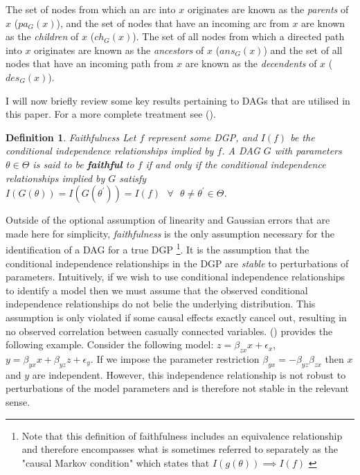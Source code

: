 \documentclass{article}
\newtheorem{definition}{Definition}
\begin{document}
The set of nodes from which an arc into $x$ originates are known as the \textit{parents} of $x$ ($pa_G(x)$), and the set of nodes that have an incoming arc from $x$ are known as the \textit{children} of $x$ ($ch_G(x)$). The set of all nodes from which a directed path into $x$ originates are known as the \textit{ancestors} of $x$ ($ans_G(x)$) and the set of all nodes that have an incoming path from $x$ are known as the \textit{decendents} of $x$ ($des_G(x)$). 

I will now briefly review some key results pertaining to DAGs that are utilised in this paper. For a more complete treatment see \citeauthor{pearl2009causality} (\citeyear{pearl2009causality}).

\theoremstyle{definition}
\begin{definition}{Faithfulness}
  Let $f$ represent some DGP, and $I(f)$ be the conditional independence relationships implied by $f$. A DAG $G$ with parameters $\theta \in \Theta$ is said to be \textbf{faithful} to $f$ if and only if the conditional independence relationships implied by $G$ satisfy $I(G(\theta)) = I(G(\theta^\prime)) = I(f) \text{  } \forall \text{  } \theta \not = \theta^\prime \in \Theta$.
  \parencite[p.48]{pearl2009causality}
  \label{faithfulness}
\end{definition}

Outside of the optional assumption of linearity and Gaussian errors that are made here for simplicity, \textit{faithfulness} is the only assumption necessary for the identification of a DAG for a true DGP \footnote{Note that this definition of faithfulness includes an equivalence relationship and therefore encompasses what is sometimes  referred to separately as the "causal Markov condition" which states that $I(g(\theta)) \implies I(f)$ \parencite{spirtes2016causal}}. It is the assumption that the conditional independence relationships in the DGP are \textit{stable} to perturbations of parameters. Intuitively, if we wish to use conditional independence relationships to identify a model then we must assume that the observed conditional independence relationships do not belie the underlying distribution. This assumption is only violated if some causal effects exactly cancel out, resulting in no observed correlation between casually connected variables. \citeauthor{pearl2009causality} (\citeyear{pearl2009causality}) provides the following example. Consider the following model: $z = \beta_{zx} x + \epsilon_x$, $ y = \beta_{yx} x + \beta_{yz} z + \epsilon_y$. If we impose the parameter restriction $\beta_{yx} = -\beta_{yz}\beta_{zx}$ then $x$ and $y$ are independent. However, this independence relationship is not robust to perturbations of the model parameters and is therefore not stable in the relevant sense. 
\end{document}

